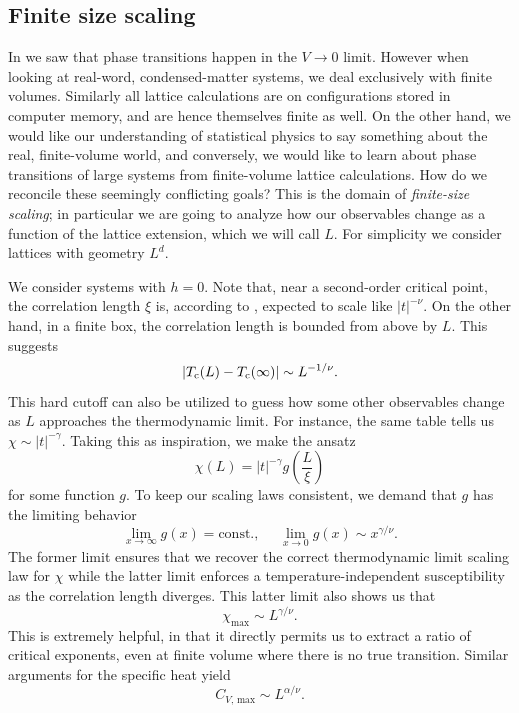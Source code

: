 \subsection{Finite size scaling}

In  we saw that phase transitions happen in the $V\to0$
limit. However when looking at real-word, condensed-matter systems, we deal
exclusively with finite volumes. Similarly all lattice calculations are on
configurations stored in computer memory, and are hence themselves finite as
well. On the other hand, we would like our understanding of statistical physics
to say something about the real, finite-volume world, and conversely, we would
like to learn about phase transitions of large systems from finite-volume
lattice calculations. How do we reconcile these seemingly conflicting goals?
This is the domain of {\it finite-size scaling}; in particular we are going to analyze
how our observables change as a function of the lattice extension, which we will
call $L$. For simplicity we consider lattices with geometry $L^d$.

We consider systems with $h=0$. 
Note that, near a second-order critical point, the correlation
length $\xi$ is, according to , expected to scale like
$|t|^{-\nu}$. On the other hand, in a finite box, the correlation length is bounded
from above by $L$. This suggests
\begin{equation}
    |T_{\rm c}(L)-T_{\rm c}(\infty)|\sim L^{-1/\nu}.
\end{equation}
This hard cutoff can also be utilized to guess how some other observables
change as $L$ approaches the thermodynamic limit. For instance, the same
table tells us $\chi\sim|t|^{-\gamma}$. Taking this as inspiration, we
make the ansatz
\begin{equation}
    \chi(L)=|t|^{-\gamma}g\left(\frac{L}{\xi}\right)
\end{equation}
for some function $g$. To keep our scaling laws consistent, we demand that 
$g$ has the limiting behavior
\begin{equation}
    \lim_{x\to\infty}g(x)=\text{const.},~~~~~~\lim_{x\to0}g(x)\sim x^{\gamma/\nu}.
\end{equation}
The former limit ensures that we recover the correct thermodynamic limit scaling law
for $\chi$ while the latter limit enforces a temperature-independent susceptibility
as the correlation length diverges. This latter limit also shows us that
\begin{equation}\label{eq:fss_susc_2nd}
    \chi_{\text{max}}\sim L^{\gamma/\nu}.
\end{equation}
This is extremely helpful, in that it directly permits us to extract a ratio of
critical exponents, even at finite volume where there is no true transition.
Similar arguments for the specific heat yield
\begin{equation}\label{eq:fss_CV}
    C_{V,\,\text{max}}\sim L^{\alpha/\nu}.
\end{equation}

